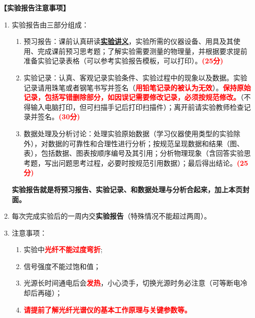 \documentclass[dvipsnames, svgnames,a4paper,11pt]{article}
\begin{document}
	\textbf{【实验报告注意事项】}
	\begin{enumerate}
		
		\item 实验报告由三部分组成：
	\begin{enumerate}[label=\textup{(\arabic*)}]
		\item 预习报告：课前认真研读\underline{\textbf{实验讲义}}，实验所需的仪器设备、用具及其使用、完成课前预习思考题；了解实验需要测量的物理量，并根据要求提前准备实验记录表格（可以参考实验报告模板，可以打印）。\textcolor{red}{\textbf{(25分)}}
		
	    \item 实验记录：认真、客观记录实验条件、实验过程中的现象以及数据。实验记录请用珠笔或者钢笔书写并签名（\textcolor{red}{\textbf{用铅笔记录的被认为无效}}）。\textcolor{red}{\textbf{保持原始记录，包括写错删除部分，如因误记需要修改记录，必须按规范修改。}}（不得输入电脑打印，但可扫描手记后打印扫描件）；离开前请实验教师检查记录并签名。\textcolor{red}{\textbf{(30分)}}
	    
	    \item 数据处理及分析讨论：处理实验原始数据（学习仪器使用类型的实验除外），对数据的可靠性和合理性进行分析；按规范呈现数据和结果（图、表），包括数据、图表按顺序编号及其引用；分析物理现象（含回答实验思考题，写出问题思考过程，必要时按规范引用数据）；最后得出结论。\textcolor{red}{\textbf{(25分)}}
	    
	\end{enumerate}
	\textbf{实验报告就是将预习报告、实验记录、和数据处理与分析合起来，加上本页封面。}
	\item 每次完成实验后的一周内交\textbf{实验报告}（特殊情况不能超过两周）。
	\item 注意事项：
		\begin{enumerate}[label=\textup{(\arabic*)}]
			\item 实验中\textcolor{red}{\textbf{光纤不能过度弯折}};
			\item 信号强度不能过饱和值；
			\item 光源长时间通电后会\textcolor{red}{\textbf{发热}}，小心烫手，切换光源时务必注意（可等断电冷却后再碰）；
			\item \textcolor{red}{\textbf{请提前了解光纤光谱仪的基本工作原理与关键参数等。}}
		\end{enumerate}
\end{enumerate}

	
	
	\clearpage
	\tableofcontents
	\clearpage
	
	\setcounter{section}{0}
\end{document}

